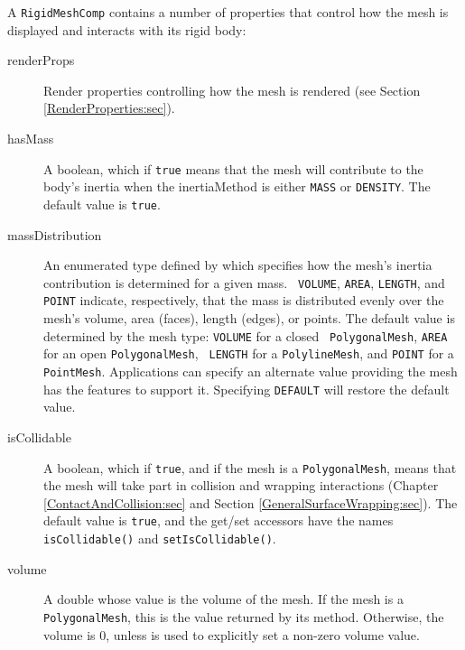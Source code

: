 A {\tt RigidMeshComp} contains a number of properties that control how
the mesh is displayed and interacts with its rigid body:

\begin{description}

\item[renderProps]\mbox{}

Render properties controlling how the mesh is
rendered (see Section \ref{RenderProperties:sec}).

\item[hasMass]\mbox{} 

A boolean, which if {\tt true} means that the mesh
will contribute to the body's inertia when the {\sf inertiaMethod}
is either {\tt MASS} or {\tt DENSITY}. The default value is {\tt true}.

\item[massDistribution]\mbox{} 

An enumerated type defined by
 which specifies how the
mesh's inertia contribution is determined for a given mass.  {\tt
VOLUME}, {\tt AREA}, {\tt LENGTH}, and {\tt POINT} indicate,
respectively, that the mass is distributed evenly over the mesh's
volume, area (faces), length (edges), or points. The default value is
determined by the mesh type: {\tt VOLUME} for a closed {\tt
PolygonalMesh}, {\tt AREA} for an open {\tt PolygonalMesh}, {\tt
LENGTH} for a {\tt PolylineMesh}, and {\tt POINT} for a {\tt
PointMesh}. Applications can specify an alternate value providing the
mesh has the features to support it. Specifying {\tt DEFAULT} will
restore the default value.

\item[isCollidable]\mbox{} 

A boolean, which if {\tt true}, and if the mesh is a
{\tt PolygonalMesh}, means that the mesh will take part in collision
and wrapping interactions (Chapter \ref{ContactAndCollision:sec} and
Section \ref{GeneralSurfaceWrapping:sec}). The default value is {\tt true},
and the get/set accessors have the names {\tt isCollidable()} and
{\tt setIsCollidable()}.

\item[volume]\mbox{} 

A double whose value is the volume of the mesh.  If the
mesh is a {\tt PolygonalMesh}, this is the value returned by its
 method.
Otherwise, the volume is 0, unless
 is
used to explicitly set a non-zero volume value.


\end{description}
